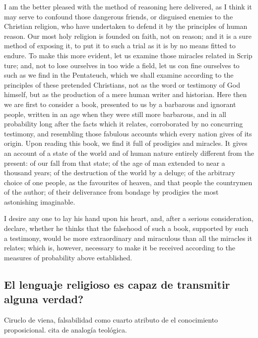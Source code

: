 I am the better pleased with the method of reasoning here delivered, as I think
it may serve to confound those dangerous friends, or disguised enemies to the
Christian religion, who have undertaken to defend it by the principles of human
reason. Our most holy religion is founded on faith, not on reason; and it is a
sure method of exposing it, to put it to such a trial as it is by no means
fitted to endure. To make this more evident, let us examine those miracles
related in Scrip ture; and, not to lose ourselves in too wide a field, let us
con fine ourselves to such as we find in the Pentateuch, which we shall examine
according to the principles of these pretended Christians, not as the word or
testimony of God himself, but as the production of a mere human writer and
historian. Here then we are first to consider a book, presented to us by a
barbarous and ignorant people, written in an age when they were still more
barbarous, and in all probability long after the facts which it relates,
corroborated by no concurring testimony, and resembling those fabulous accounts
which every nation gives of its origin. Upon reading this book, we find it full
of prodigies and miracles. It gives an account of a state of the world and of
human nature entirely different from the present: of our fall from that state;
of the age of man extended to near a thousand years; of the destruction of the
world by a deluge; of the arbitrary choice of one people, as the favourites of
heaven, and that people the countrymen of the author; of their deliverance from
bondage by prodigies the most astonishing imaginable.

I desire any one to lay his hand upon his heart, and, after a serious
consideration, declare, whether he thinks that the falsehood of such a book,
supported by such a testimony, would be more extraordinary and miraculous than
all the miracles it relates; which is, however, necessary to make it be received
according to the measures of probability above established.

\subsection{El lenguaje religioso es capaz de transmitir alguna verdad?}
Ciruclo de viena, falsabilidad como cuarto atributo de el conocimiento
proposicional. cita de analogía teológica.
